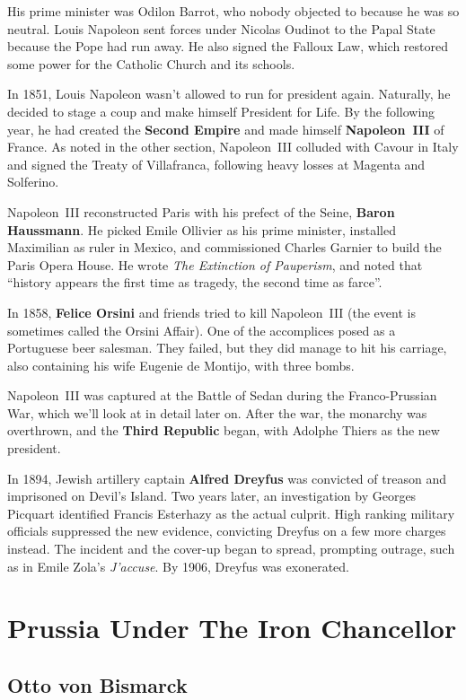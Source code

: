 His prime minister was Odilon Barrot, who nobody objected to because he was so neutral.
Louis Napoleon sent forces under Nicolas Oudinot to the Papal State because the Pope had run away.
He also signed the Falloux Law, which restored some power for the Catholic Church and its schools.

In 1851, Louis Napoleon wasn't allowed to run for president again.
Naturally, he decided to stage a coup and make himself President for Life.
By the following year,
he had created the \textbf{Second Empire} and made himself \textbf{Napoleon~III} of France.
As noted in the other section, Napoleon~III colluded with Cavour in Italy and signed the Treaty of Villafranca,
following heavy losses at Magenta and Solferino.

Napoleon~III reconstructed Paris with his prefect of the Seine, \textbf{Baron Haussmann}.
He picked Emile Ollivier as his prime minister,
installed Maximilian as ruler in Mexico,
and commissioned Charles Garnier to build the Paris Opera House.
He wrote \textit{The Extinction of Pauperism},
and noted that ``history appears the first time as tragedy, the second time as farce''.

In 1858, \textbf{Felice Orsini} and friends tried to kill Napoleon~III
(the event is sometimes called the Orsini Affair).
One of the accomplices posed as a Portuguese beer salesman.
They failed, but they did manage to hit his carriage, also containing his wife Eugenie de Montijo, with three bombs.

Napoleon~III was captured at the Battle of Sedan during the Franco-Prussian War,
which we'll look at in detail later on.
After the war, the monarchy was overthrown, and the \textbf{Third Republic} began,
with Adolphe Thiers as the new president.

In 1894, Jewish artillery captain \textbf{Alfred Dreyfus} was convicted of treason and imprisoned on Devil's Island.
Two years later, an investigation by Georges Picquart identified Francis Esterhazy as the actual culprit.
High ranking military officials suppressed the new evidence, convicting Dreyfus on a few more charges instead.
The incident and the cover-up began to spread, prompting outrage, such as in Emile Zola's \textit{J'accuse}.
By 1906, Dreyfus was exonerated.

\section{Prussia Under The Iron Chancellor}

\subsection*{Otto von Bismarck}

